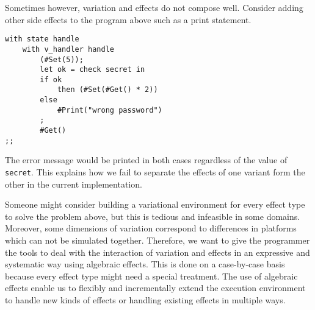 Sometimes however, variation and effects do not compose well. Consider adding other side effects to the program above such as a print statement. 
%
\begin{lstlisting}[]
with state handle
    with v_handler handle
        (#Set(5));
        let ok = check secret in
    	if ok 
    	    then (#Set(#Get() * 2))
    	else
            #Print("wrong password")
        ;
        #Get()
;;
\end{lstlisting}
%
The error message would be printed in both cases regardless of the value of \texttt{secret}. This explains how we fail to separate the effects of one variant form the other in the current implementation.   

Someone might consider building a variational environment for every effect type to solve the problem above, but this is tedious and infeasible in some domains. Moreover, some dimensions of variation correspond to differences in platforms which can not be simulated together. Therefore, we want to give the programmer the tools to deal with the interaction of variation and effects in an expressive and systematic way using algebraic effects. This is done on a case-by-case basis because every effect type might need a special treatment. The use of algebraic effects enable us to flexibly and incrementally extend the execution environment to handle new kinds of effects or handling existing effects in multiple ways. 